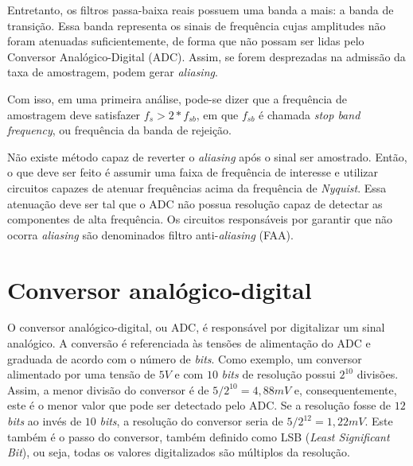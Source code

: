 \documentclass[11pt]{abntex2}
\begin{document}
				Entretanto, os filtros passa-baixa reais possuem uma banda a
				mais: a banda de transição. Essa banda representa os sinais de
				frequência cujas amplitudes não foram atenuadas suficientemente,
				de forma que não possam ser lidas pelo Conversor Analógico-Digital
				(ADC). Assim, se forem desprezadas na admissão da taxa de amostragem,
				podem gerar \textit{aliasing}.

				Com isso, em uma primeira análise, pode-se dizer que a frequência de
				amostragem deve satisfazer $f_s>2*f_{sb}$, em que $f_{sb}$ é chamada
				\textit{stop band frequency}, ou frequência da banda de rejeição.

				Não existe método capaz de reverter o \textit{aliasing} após o
				sinal ser amostrado. Então, o que deve ser feito é assumir uma
				faixa de frequência de interesse e utilizar circuitos capazes de
				atenuar frequências acima da frequência de \textit{Nyquist}.
				Essa atenuação deve ser tal que o ADC não possua resolução capaz
				de detectar as componentes de alta frequência. Os circuitos
				responsáveis por garantir que não ocorra \textit{aliasing} são
				denominados filtro anti-\textit{aliasing} (FAA).

			\section{Conversor analógico-digital}
				O conversor analógico-digital, ou ADC, é responsável por digitalizar
				um sinal analógico. A conversão é referenciada às tensões de alimentação
				do ADC e graduada de acordo com o número de \textit{bits}. Como exemplo,
				um conversor alimentado por uma tensão de $5V$ e com $10$ \textit{bits} de
				resolução possui $2^{10}$ divisões. Assim, a menor divisão do conversor é
				de $5/2^{10} = 4,88mV$ e, consequentemente, este é o menor valor que pode
				ser detectado pelo ADC. Se a resolução fosse de $12$ \textit{bits} ao invés
				de $10$ \textit{bits}, a resolução do conversor seria de $5/2^{12}=1,22mV$.
				Este também é o passo do conversor, também definido como LSB
				(\textit{Least Significant Bit}), ou seja, todas os valores digitalizados
				são múltiplos da resolução.

        
\end{document}

